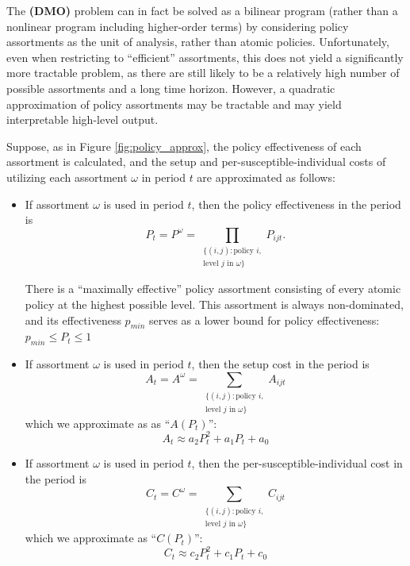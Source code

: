 \documentclass{article}
\newcommand{\model}{{\bf (DMO) }}
\begin{document}
The \model problem can in fact be solved as a bilinear program (rather than a nonlinear program including higher-order terms) by considering policy assortments as the unit of analysis, rather than atomic policies. Unfortunately, even when restricting to ``efficient'' assortments, this does not yield a significantly more tractable problem, as there are still likely to be a relatively high number of possible assortments and a long time horizon. However, a quadratic approximation of policy assortments may be tractable and may yield interpretable high-level output.

Suppose, as in Figure \ref{fig:policy_approx}, the policy effectiveness of each assortment is calculated, and the setup and per-susceptible-individual costs of utilizing each assortment $\omega$ in period $t$ are approximated as follows:
\begin{itemize}
    \item If assortment $\omega$ is used in period $t$, then the policy effectiveness in the period is
    \begin{equation}\label{eq:assortment_P}
        P_t = P^\omega = \prod_{\substack{\{(i,j) : \text{policy $i$,}\\\text{level $j$ in $\omega$}\}}}P_{ijt}.
    \end{equation}

    There is a ``maximally effective'' policy assortment consisting of every atomic policy at the highest possible level. This assortment is always non-dominated, and its effectiveness $p_{min}$ serves as a lower bound for policy effectiveness: $p_{min} \le P_t \le 1$


   \item If assortment $\omega$ is used in period $t$, then the setup cost in the period is
    \begin{equation}\label{eq:assortment_A}
        A_t = A^\omega = \sum_{\substack{\{(i,j) : \text{policy $i$,}\\\text{level $j$ in $\omega$}\}}}A_{ijt}
    \end{equation}
    which we approximate as as ``$A(P_t)$'':
    \[
        A_t \approx a_2 P_t^2 + a_1 P_t + a_0
    \]

    \item If assortment $\omega$ is used in period $t$, then the per-susceptible-individual cost in the period is
    \begin{equation}\label{eq:assortment_C}
        C_t = C^\omega =  \sum_{\substack{\{(i,j) : \text{policy $i$,}\\\text{level $j$ in $\omega$}\}}}C_{ijt}
    \end{equation}
    which we approximate as ``$C(P_t)$'':
    \[
        C_t \approx c_2 P_t^2 + c_1 P_t + c_0
    \]
\end{itemize}
\end{document}
